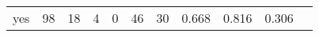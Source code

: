 \begin{longtable}{lp{1.10cm}p{1.10cm}p{1.10cm}p{1.10cm}p{1.10cm}p{1.10cm}p{1.10cm}p{1.10cm}p{1.10cm}p{1.10cm}}
yes       &                     98 &                                 18 &                                 4 &                                0 &                                46 &                              30 &                          0.668 &                                 0.816 &                               0.306 \\
\end{longtable}
